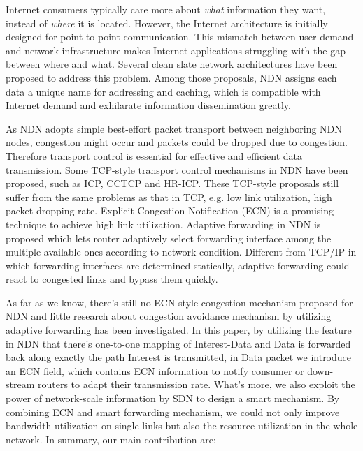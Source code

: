 
Internet consumers typically care more about \emph{what} information they want, instead of \emph{where} it is located. However, the Internet architecture is initially designed for point-to-point communication. This mismatch between user demand and network infrastructure makes Internet applications struggling with the gap between where and what. Several clean slate network architectures have been proposed to address this problem. Among those proposals, NDN\cite{NDN} assigns each data a unique name for addressing and caching, which is compatible with Internet demand and exhilarate information dissemination greatly. 

As NDN adopts simple best-effort packet transport between neighboring NDN nodes, congestion might occur and packets could be dropped due to congestion. Therefore transport control is essential for effective and efficient data transmission. Some TCP-style transport control mechanisms in NDN have been proposed, such as ICP\cite{ICP}, CCTCP\cite{CCTCP} and HR-ICP\cite{shape}. These TCP-style proposals still suffer from the same problems as that in TCP, e.g. low link utilization, high packet dropping rate. Explicit Congestion Notification (ECN) is a promising technique to achieve high link utilization\cite{XCP}. Adaptive forwarding\cite{Adaptive} in NDN is proposed which lets router adaptively select forwarding interface among the multiple available ones according to network condition. Different from TCP/IP in which forwarding interfaces are determined statically, adaptive forwarding could react to congested links and bypass them quickly.

As far as we know, there's still no ECN-style congestion mechanism proposed for NDN and little research about congestion avoidance mechanism by utilizing adaptive forwarding has been investigated. In this paper, by utilizing the feature in NDN that there's one-to-one mapping of Interest-Data and Data is forwarded back along exactly the path Interest is transmitted, in Data packet we introduce an ECN field, which contains ECN information to notify consumer or down-stream routers to adapt their transmission rate. What's more, we also exploit the power of network-scale information by SDN\cite{SDN} to design a smart  mechanism. By combining ECN and smart forwarding mechanism, we could not only improve bandwidth utilization on single links but also the resource utilization in the whole network. In summary, our main contribution are:

